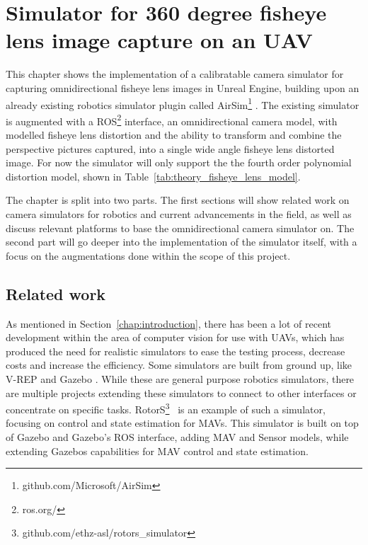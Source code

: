 
\chapter{Simulator for 360 degree fisheye lens image capture on an UAV} \label{chap:simulator}

This chapter shows the implementation of a calibratable camera simulator for capturing omnidirectional fisheye lens images in Unreal Engine, building upon an already existing robotics simulator plugin called AirSim\footnote{github.com/Microsoft/AirSim} \cite{Airsim_paper}. The existing simulator is augmented with a ROS\footnote{ros.org/} interface, an omnidirectional camera model, with modelled fisheye lens distortion and the ability to transform and combine the perspective pictures captured, into a single wide angle fisheye lens distorted image. For now the simulator will only support the the fourth order polynomial distortion model, shown in Table~\ref{tab:theory_fisheye_lens_model}.

The chapter is split into two parts. The first sections will show related work on camera simulators for robotics and current advancements in the field, as well as discuss relevant platforms to base the omnidirectional camera simulator on. The second part will go deeper into the implementation of the simulator itself, with a focus on the augmentations done within the scope of this project.

\section{Related work} \label{sec:simulator_related}

As mentioned in Section~\ref{chap:introduction}, there has been a lot of recent development within the area of computer vision for use with UAVs, which has produced the need for realistic simulators to ease the testing process, decrease costs and increase the efficiency. Some simulators are built from ground up, like V-REP \cite{VREP2013} and Gazebo \cite{GazeboPaper}. While these are general purpose robotics simulators, there are multiple projects extending these simulators to connect to other interfaces or concentrate on specific tasks. RotorS\footnote{github.com/ethz-asl/rotors\_simulator}~\cite{RotorS} is an example of such a simulator, focusing on control and state estimation for MAVs. This simulator is built on top of Gazebo and Gazebo's ROS interface, adding MAV and Sensor models, while extending Gazebos capabilities for MAV control and state estimation.

